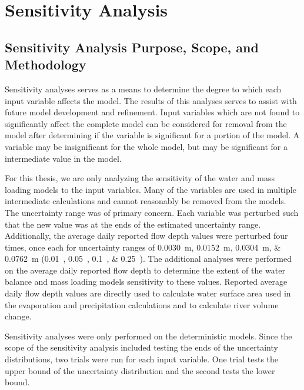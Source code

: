 \renewcommand{\thechapter}{6}
\chapter{Sensitivity Analysis}
\label{chap:SensitivityAnalysis}

\begin{linenumbers}
\section{Sensitivity Analysis Purpose, Scope, and Methodology}
\label{sec:PurposeAndScope}

Sensitivity analyses serves as a means to determine the degree to which each input variable affects the model.  The results of this analyses serves to assist with future model development and refinement.  Input variables which are not found to significantly affect the complete model can be considered for removal from the model after determining if the variable is significant for a portion of the model.  A variable may be insignificant for the whole model, but may be significant for a intermediate value in the model.

For this thesis, we are only analyzing the sensitivity of the water and mass loading models to the input variables.  Many of the variables are used in multiple intermediate calculations and cannot reasonably be removed from the models.  The uncertainty range was of primary concern.  Each variable was perturbed such that the new value was at the ends of the estimated uncertainty range.  Additionally, the average daily reported flow depth values were perturbed four times, once each for uncertainty ranges of \SIlist{0.0030;0.0152;0.0304;0.0762}{\meter} (\SIlist{0.01;0.05;0.1;0.25}{\foot}).  The additional analyses were performed on the average daily reported flow depth to determine the extent of the water balance and mass loading models sensitivity to these values.  Reported average daily flow depth values are directly used to calculate water surface area used in the evaporation and precipitation calculations and to calculate river volume change.

Sensitivity analyses were only performed on the deterministic models.   Since the scope of the sensitivity analysis included testing the ends of the uncertainty distributions, two trials were run for each input variable.  One trial tests the upper bound of the uncertainty distribution and the second tests the lower bound.


\end{linenumbers}

